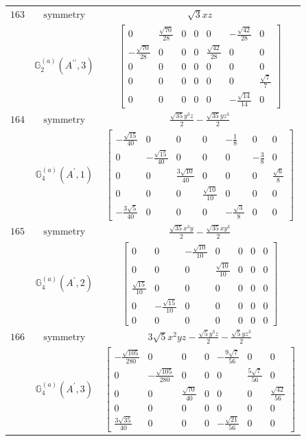 \documentclass[fleqn,8pt,landscape]{jsarticle}
\begin{document}
\begin{longtable}{ccc}
$ 163 $ & $ \text{symmetry} $ & $ \sqrt{3} x z $ \\
$  $ & $ \mathbb{G}_{2}^{(a)}(A^{\prime\prime},3) $ & $ \begin{bmatrix} 0 & \frac{\sqrt{70}}{28} & 0 & 0 & 0 & - \frac{\sqrt{42}}{28} & 0 \\ - \frac{\sqrt{70}}{28} & 0 & 0 & 0 & \frac{\sqrt{42}}{28} & 0 & 0 \\ 0 & 0 & 0 & 0 & 0 & 0 & 0 \\ 0 & 0 & 0 & 0 & 0 & 0 & \frac{\sqrt{7}}{7} \\ 0 & 0 & 0 & 0 & 0 & - \frac{\sqrt{14}}{14} & 0 \end{bmatrix} $ \\ \hline
$ 164 $ & $ \text{symmetry} $ & $ \frac{\sqrt{35} y^{3} z}{2} - \frac{\sqrt{35} y z^{3}}{2} $ \\
$  $ & $ \mathbb{G}_{4}^{(a)}(A^{\prime},1) $ & $ \begin{bmatrix} - \frac{\sqrt{15}}{40} & 0 & 0 & 0 & - \frac{1}{8} & 0 & 0 \\ 0 & - \frac{\sqrt{15}}{40} & 0 & 0 & 0 & - \frac{3}{8} & 0 \\ 0 & 0 & \frac{3 \sqrt{10}}{40} & 0 & 0 & 0 & \frac{\sqrt{6}}{8} \\ 0 & 0 & 0 & \frac{\sqrt{10}}{10} & 0 & 0 & 0 \\ - \frac{3 \sqrt{5}}{40} & 0 & 0 & 0 & - \frac{\sqrt{3}}{8} & 0 & 0 \end{bmatrix} $ \\ \hline
$ 165 $ & $ \text{symmetry} $ & $ \frac{\sqrt{35} x^{3} y}{2} - \frac{\sqrt{35} x y^{3}}{2} $ \\
$  $ & $ \mathbb{G}_{4}^{(a)}(A^{\prime},2) $ & $ \begin{bmatrix} 0 & 0 & - \frac{\sqrt{10}}{10} & 0 & 0 & 0 & 0 \\ 0 & 0 & 0 & \frac{\sqrt{10}}{10} & 0 & 0 & 0 \\ \frac{\sqrt{15}}{10} & 0 & 0 & 0 & 0 & 0 & 0 \\ 0 & - \frac{\sqrt{15}}{10} & 0 & 0 & 0 & 0 & 0 \\ 0 & 0 & 0 & 0 & 0 & 0 & 0 \end{bmatrix} $ \\ \hline
$ 166 $ & $ \text{symmetry} $ & $ 3 \sqrt{5} x^{2} y z - \frac{\sqrt{5} y^{3} z}{2} - \frac{\sqrt{5} y z^{3}}{2} $ \\
$  $ & $ \mathbb{G}_{4}^{(a)}(A^{\prime},3) $ & $ \begin{bmatrix} - \frac{\sqrt{105}}{280} & 0 & 0 & 0 & - \frac{9 \sqrt{7}}{56} & 0 & 0 \\ 0 & - \frac{\sqrt{105}}{280} & 0 & 0 & 0 & \frac{5 \sqrt{7}}{56} & 0 \\ 0 & 0 & \frac{\sqrt{70}}{40} & 0 & 0 & 0 & \frac{\sqrt{42}}{56} \\ 0 & 0 & 0 & 0 & 0 & 0 & 0 \\ \frac{3 \sqrt{35}}{40} & 0 & 0 & 0 & - \frac{\sqrt{21}}{56} & 0 & 0 \end{bmatrix} $ \\ \hline

\end{longtable}
\end{document}
